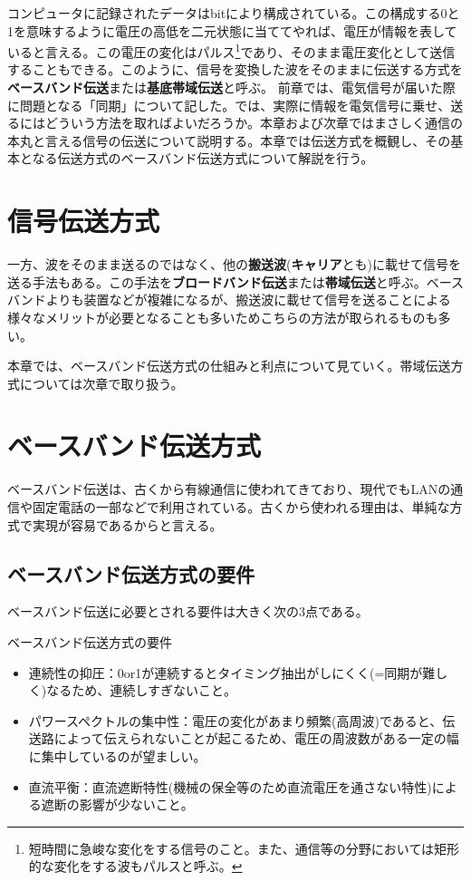 コンピュータに記録されたデータはbitにより構成されている。この構成する0と1を意味するように電圧の高低を二元状態に当ててやれば、電圧が情報を表していると言える。この電圧の変化はパルス\footnote{短時間に急峻な変化をする信号のこと。また、通信等の分野においては矩形的な変化をする波もパルスと呼ぶ。}であり、そのまま電圧変化として送信することもできる。このように、信号を変換した波をそのままに伝送する方式を\textbf{ベースバンド伝送}または\textbf{基底帯域伝送}と呼ぶ。
前章では、電気信号が届いた際に問題となる「同期」について記した。では、実際に情報を電気信号に乗せ、送るにはどういう方法を取ればよいだろうか。本章および次章ではまさしく通信の本丸と言える信号の伝送について説明する。本章では伝送方式を概観し、その基本となる伝送方式のベースバンド伝送方式について解説を行う。

\section{信号伝送方式}

一方、波をそのまま送るのではなく、他の\textbf{搬送波}(\textbf{キャリア}とも)に載せて信号を送る手法もある。この手法を\textbf{ブロードバンド伝送}または\textbf{帯域伝送}と呼ぶ。ベースバンドよりも装置などが複雑になるが、搬送波に載せて信号を送ることによる様々なメリットが必要となることも多いためこちらの方法が取られるものも多い。

本章では、ベースバンド伝送方式の仕組みと利点について見ていく。帯域伝送方式については次章で取り扱う。

\section{ベースバンド伝送方式}
ベースバンド伝送は、古くから有線通信に使われてきており、現代でもLANの通信や固定電話の一部などで利用されている。古くから使われる理由は、単純な方式で実現が容易であるからと言える。

\subsection{ベースバンド伝送方式の要件}
ベースバンド伝送に必要とされる要件は大きく次の3点である。

\begin{itembox}[l]{ベースバンド伝送方式の要件}
\begin{itemize}
\item 連続性の抑圧：0or1が連続するとタイミング抽出がしにくく(=同期が難しく)なるため、連続しすぎないこと。
\item パワースペクトルの集中性：電圧の変化があまり頻繁(高周波)であると、伝送路によって伝えられないことが起こるため、電圧の周波数がある一定の幅に集中しているのが望ましい。
\item 直流平衡：直流遮断特性(機械の保全等のため直流電圧を通さない特性)による遮断の影響が少ないこと。
\end{itemize}
\end{itembox}


